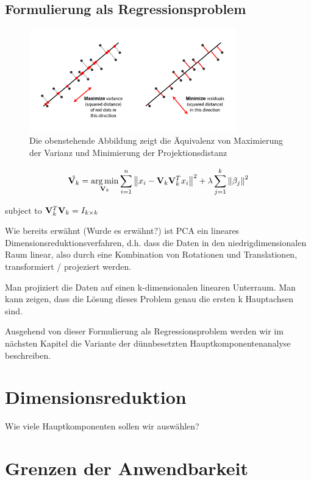 \subsection{Formulierung als Regressionsproblem}

\begin{figure}
\centering
\includegraphics[width = 0.8\textwidth]{figures/pca_projection_explanation.png}
\caption{Die obenstehende Abbildung zeigt die Äquivalenz von Maximierung der Varianz und Minimierung der Projektionsdistanz}
\label{pca_projection_explanation}
\end{figure}

$$\hat{\mathbf{V}_k} = \operatorname*{arg\,min}_{\mathbf{V}_k} \sum_{i=1}^{n} \left\lVert x_i - \mathbf{V}_k \mathbf{V}_k^Tx_i \right\rVert^2 + \lambda \sum_{j=1}^{k}\left\lVert \beta_j \right\rVert^2$$

subject to $\mathbf{V}_k^T\mathbf{V}_k = I_{k \times k}$

Wie bereits erwähnt (Wurde es erwähnt?) ist PCA ein lineares Dimensionsreduktionsverfahren, d.h. dass die Daten in den niedrigdimensionalen Raum linear, also durch eine Kombination von Rotationen und Translationen, transformiert / projeziert  werden. 

\cite{zou_sparsepca}

Man projiziert die Daten auf einen k-dimensionalen linearen Unterraum. Man kann zeigen, dass die Lösung dieses Problem genau die ersten k Hauptachsen sind.

Ausgehend von dieser Formulierung als Regressionsproblem werden wir im nächsten Kapitel die Variante der dünnbesetzten Hauptkomponentenanalyse beschreiben.

\section{Dimensionsreduktion}
Wie viele Hauptkomponenten sollen wir auswählen?

\section{Grenzen der Anwendbarkeit}

